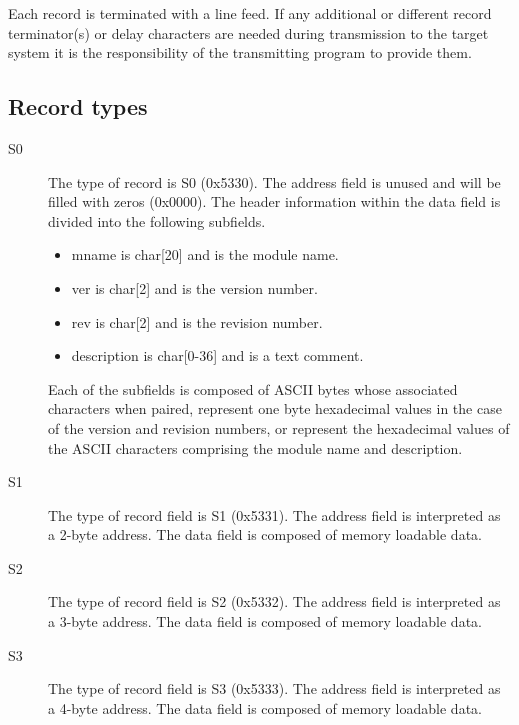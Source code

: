     Each record is terminated with a line feed. If any additional or different record terminator(s) or delay characters are needed during transmission to the target system it is the responsibility of the transmitting program to provide them.

    \subsection{Record types}
        \begin{description}
            \item[S0]
                The type of record is S0 (0x5330). The address field is unused and will be filled with zeros (0x0000). The header information within the data field is divided into the following subfields.

                \begin{itemize}
                    \item mname is char[20] and is the module name.
                    \item ver is char[2] and is the version number.
                    \item rev is char[2] and is the revision number.
                    \item description is char[0-36] and is a text comment.
                \end{itemize}

                Each of the subfields is composed of ASCII bytes whose associated characters when paired, represent one byte hexadecimal values in the case of the version and revision numbers, or represent the hexadecimal values of the ASCII characters comprising the module name and description.

            \item[S1]
                The type of record field is S1 (0x5331). The address field is interpreted as a 2-byte address. The data field is composed of memory loadable data.

            \item[S2]
                The type of record field is S2 (0x5332). The address field is interpreted as a 3-byte address. The data field is composed of memory loadable data.

            \item[S3]
                The type of record field is S3 (0x5333). The address field is interpreted as a 4-byte address. The data field is composed of memory loadable data.


\end{description}
